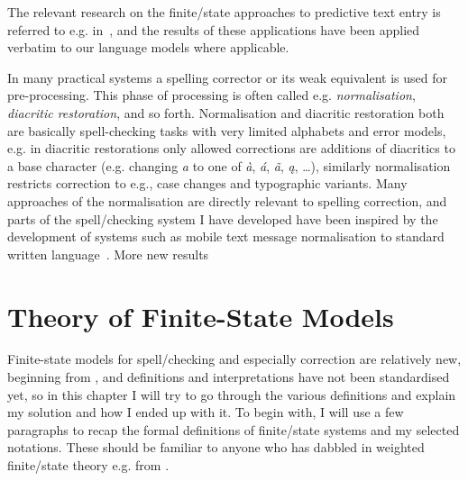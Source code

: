 \documentclass[officiallayout]{unihelcompling}
\begin{document}
The relevant research on the finite\-/state approaches to predictive text entry
is referred to e.g. in~\citet{silfverberg2010partofspeech}, and the results of
these applications have been applied verbatim to our language models where
applicable.

In many practical systems a spelling corrector or its weak equivalent is used
for pre-processing. This phase of processing is often called e.g.
\emph{normalisation}, \emph{diacritic restoration}, and so forth. Normalisation
and diacritic restoration both are basically spell-checking tasks with very
limited alphabets and error models, e.g. in diacritic restorations only allowed
corrections are additions of diacritics to a base character (e.g. changing
\emph{a} to one of \emph{à}, \emph{á}, \emph{ã}, \emph{ą}, \ldots), similarly
normalisation restricts correction to e.g., case changes and typographic
variants.  Many approaches of the normalisation are directly relevant to
spelling correction, and parts of the spell\-/checking system I have developed
have been inspired by the development of systems such as mobile text message
normalisation to standard written language~\citep{kobus2008normalizing}.  More
new results\citet{petterson2013,porta2013}

\section{Theory of Finite-State Models}
\label{sec:finite-state-theory}

Finite-state models for spell\-/checking and especially correction are relatively
new, beginning from \citep{oflazer1996errortolerant}, and
definitions and interpretations have not been standardised yet, so in this
chapter I will try to go through the various definitions and explain my
solution and how I ended up with it. To begin with, I will use a few paragraphs
to recap the formal definitions of finite\-/state systems and my selected
notations. These should be familiar to anyone who has dabbled in weighted
finite\-/state theory e.g. from \citet{aho2007compilers,mohri1997finitestate}.
\end{document}
